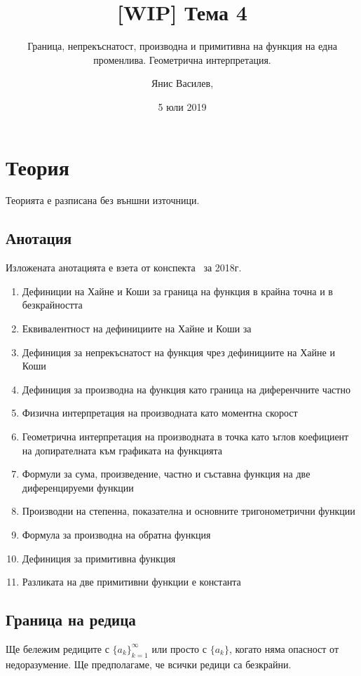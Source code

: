 \documentclass[numbers=endperiod, DIV=15, bibliography=totocnumbered]{scrartcl}
\title{[WIP] Тема 4}
\subtitle{Граница, непрекъснатост, производна и примитивна на функция на една променлива. Геометрична интерпретация.}
\author{Янис Василев, \Email{ianis@ivasilev.net}}
\date{5 юли 2019}
\begin{document}
\maketitle

\section{Теория}

Теорията е разписана без външни източници.

\subsection{Анотация}

Изложената анотацията е взета от конспекта~\cite{Syllabus} за 2018г.

\begin{enumerate}
  \item Дефиниции на Хайне и Коши за граница на функция в крайна точна и в безкрайността
  \item Еквивалентност на дефинициите на Хайне и Коши за
  \item Дефиниция за непрекъснатост на функция чрез дефинициите на Хайне и Коши
  \item Дефиниция за производна на функция като граница на диференчните частно
  \item Физична интерпретация на производната като моментна скорост
  \item Геометрична интерпретация на производната в точка като ъглов коефициент на допирателната към графиката на функцията
  \item Формули за сума, произведение, частно и съставна функция на две диференцируеми функции
  \item Производни на степенна, показателна и основните тригонометрични функции
  \item Формула за производна на обратна функция
  \item Дефиниция за примитивна функция
  \item Разликата на две примитивни функции е константа
\end{enumerate}

\subsection{Граница на редица}

Ще бележим редиците с ${\{ a_k \}}_{k=1}^\infty$ или просто с $\{ a_k \}$, когато няма опасност от недоразумение. Ще предполагаме, че всички редици са безкрайни.
\end{document}
